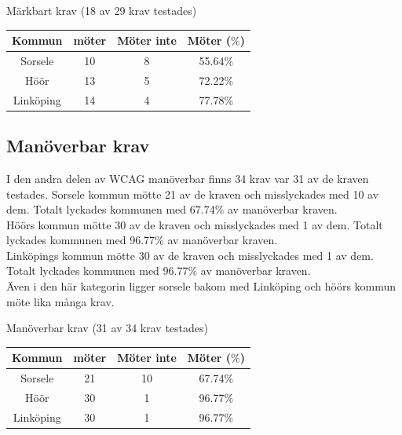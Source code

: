 \documentclass[11p]{article}
\begin{document}
    \begin{center}
    Märkbart krav (18 av 29 krav testades)

    \begin{tabular}{ |c|c|c|c|}
        \hline
        Kommun & möter & Möter inte & Möter ($\%$) \\  \hline
        Sorsele & 10 & 8 & 55.64$\%$ \\ \hline
        Höör & 13 & 5 & 72.22$\%$ \\ \hline
        Linköping & 14 & 4 & 77.78$\%$ \\ \hline
    \end{tabular}
    \end{center}

    \subsection{Manöverbar krav}
    I den andra delen av WCAG manöverbar finns 34 krav var 31 av de kraven testades.
    Sorsele kommun mötte 21 av de kraven och misslyckades med 10 av dem.
    Totalt lyckades kommunen med 67.74$\%$ av manöverbar kraven.
    \\Höörs kommun mötte 30 av de kraven och misslyckades med 1 av dem.
    Totalt lyckades kommunen med 96.77$\%$ av manöverbar kraven.
    \\Linköpings kommun mötte 30 av de kraven och misslyckades med 1 av dem.
    Totalt lyckades kommunen med 96.77$\%$ av manöverbar kraven.
    \\Även i den här kategorin ligger sorsele bakom med Linköping och höörs kommun möte lika många krav.

    \begin{center}
    Manöverbar krav (31 av 34 krav testades)

    \begin{tabular}{ |c|c|c|c|}
        \hline
        Kommun & möter & Möter inte & Möter ($\%$) \\  \hline
        Sorsele & 21 & 10 & 67.74$\%$ \\ \hline
        Höör & 30 & 1 & 96.77$\%$ \\ \hline
        Linköping & 30 & 1 & 96.77$\%$ \\ \hline
    \end{tabular}
    \end{center}
\end{document}
